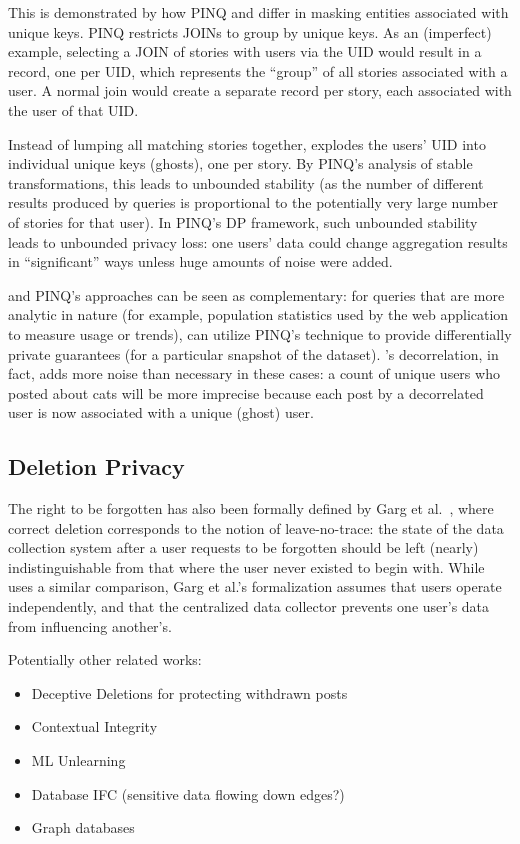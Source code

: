 This is demonstrated by how PINQ and \name differ in masking entities associated with unique keys.
PINQ restricts JOINs to group by unique keys. As an (imperfect) example, selecting a JOIN of stories
with users via the UID would result in a record, one per UID, which represents the ``group'' of all
stories associated with a user. A normal join would create a separate record per story, each
associated with the user of that UID.

Instead of lumping all matching stories together, \name explodes the users' UID into individual
unique keys (ghosts), one per story. By PINQ's analysis of stable transformations, this leads to
unbounded stability (as the number of different results produced by queries is proportional to the
potentially very large number of stories for that user). In PINQ's DP framework, such unbounded
stability leads to unbounded privacy loss: one users' data could change aggregation results in
``significant'' ways unless huge amounts of noise were added. 

\name and PINQ's approaches can be seen as complementary: for queries that are more analytic in nature (for example,
population statistics used by the web application to measure usage or trends), \name can utilize
PINQ's technique to provide differentially private guarantees (for a particular snapshot of the
dataset).  \name's decorrelation, in fact, adds more noise than necessary in these cases: a count
of unique users who posted about cats will be more imprecise because each post by a decorrelated
user is now associated with a unique (ghost) user.

\subsection{Deletion Privacy}
The right to be forgotten has also been formally defined by Garg et
al.~\cite{garg}, where correct deletion corresponds to the notion of
leave-no-trace: the state of the data collection system after a user requests to be forgotten should
be left (nearly) indistinguishable from that where the user never existed to begin with. While
\name uses a similar comparison, Garg et al.'s formalization assumes that users operate
independently, and that the centralized data collector prevents one user's data from influencing
another's.

Potentially other related works:
\begin{itemize}
    \item Deceptive Deletions for protecting withdrawn posts %
    \item Contextual Integrity
    \item ML Unlearning
    \item Database IFC (sensitive data flowing down edges?)
    \item Graph databases
\end{itemize}
\fi
